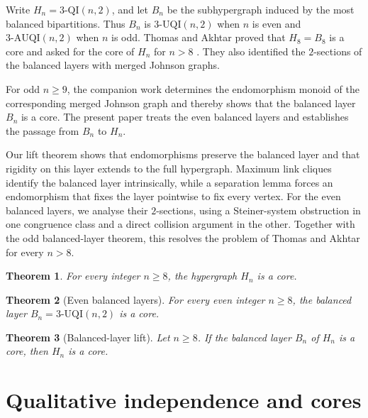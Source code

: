 \documentclass[11pt]{article}
\newtheorem{theorem}{Theorem}[section]
\begin{document}
Write \(H_n=3\text{-}\mathrm{QI}(n,2)\), and let \(B_n\) be the subhypergraph
induced by the most balanced bipartitions.  Thus \(B_n\) is
\(3\text{-}\mathrm{UQI}(n,2)\) when \(n\) is even and
\(3\text{-}\mathrm{AUQI}(n,2)\) when \(n\) is odd.  Thomas and Akhtar proved
that \(H_8=B_8\) is a core and asked for the core of \(H_n\) for \(n>8\)
\cite{ThomasAkhtar2026}.  They also identified the \(2\)-sections of the
balanced layers with merged Johnson graphs.

For odd \(n\ge9\), the companion work \cite{KimMergedJohnson2026} determines
the endomorphism monoid of the corresponding merged Johnson graph and thereby
shows that the balanced layer \(B_n\) is a core.  The present paper treats the
even balanced layers and establishes the passage from \(B_n\) to \(H_n\).

Our lift theorem shows that endomorphisms preserve the balanced layer and that
rigidity on this layer extends to the full hypergraph.  Maximum link cliques
identify the balanced layer intrinsically, while a separation lemma forces an
endomorphism that fixes the layer pointwise to fix every vertex.  For the even
balanced layers, we analyse their \(2\)-sections, using a Steiner-system
obstruction in one congruence class and a direct collision argument in the
other.  Together
with the odd balanced-layer theorem, this resolves the problem of Thomas and
Akhtar for every \(n>8\).

\begin{theorem}\label{thm:main}
For every integer \(n\ge8\), the hypergraph \(H_n\) is a core.
\end{theorem}

\begin{theorem}[Even balanced layers]\label{thm:even-middle}
For every even integer \(n\ge8\), the balanced layer
\(B_n=3\text{-}\mathrm{UQI}(n,2)\) is a core.
\end{theorem}

\begin{theorem}[Balanced-layer lift]\label{thm:lift}
Let \(n\ge8\).  If the balanced layer \(B_n\) of \(H_n\) is a core, then
\(H_n\) is a core.
\end{theorem}

\section{Qualitative independence and cores}
\end{document}
